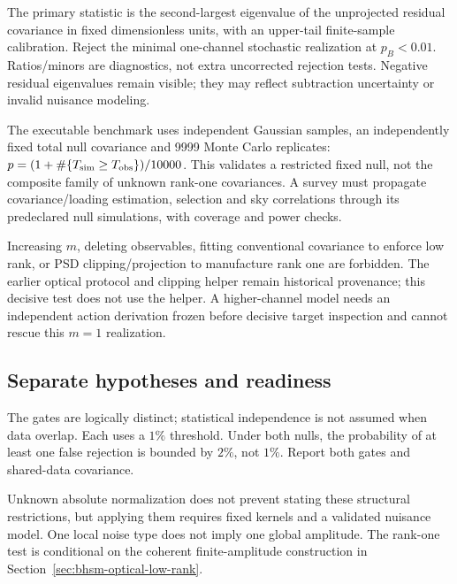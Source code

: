 The primary statistic is the second-largest eigenvalue of the unprojected
residual covariance in fixed dimensionless units, with an upper-tail
finite-sample calibration. Reject the minimal one-channel stochastic
realization at $p_B<0.01$. Ratios/minors are diagnostics, not extra
uncorrected rejection tests. Negative residual eigenvalues remain visible;
they may reflect subtraction uncertainty or invalid nuisance modeling.

The executable benchmark uses independent Gaussian samples, an independently
fixed total null covariance and 9999 Monte Carlo replicates:
$p=(1+\#\{T_{\rm sim}\ge T_{\rm obs}\})/10000$.
This validates a restricted fixed null, not the composite family of
unknown rank-one covariances. A survey must propagate covariance/loading
estimation, selection and sky correlations through its predeclared null
simulations, with coverage and power checks.

Increasing $m$, deleting observables, fitting conventional covariance to
enforce low rank, or PSD clipping/projection to manufacture rank one are
forbidden. The earlier optical protocol and clipping helper remain historical
provenance; this decisive test does not use the helper.
A higher-channel model needs an independent action derivation frozen before
decisive target inspection and cannot rescue this $m=1$ realization.

\subsection{Separate hypotheses and readiness}
The gates are logically distinct; statistical independence is not assumed
when data overlap. Each uses a $1\%$ threshold. Under both nulls, the
probability of at least one false rejection is bounded by $2\%$, not $1\%$.
Report both gates and shared-data covariance.

Unknown absolute normalization does not prevent stating these structural
restrictions, but applying them requires fixed kernels and a validated
nuisance model. One local noise type does not imply one global amplitude.
The rank-one test is conditional on the coherent finite-amplitude
construction in Section~\ref{sec:bhsm-optical-low-rank}.
